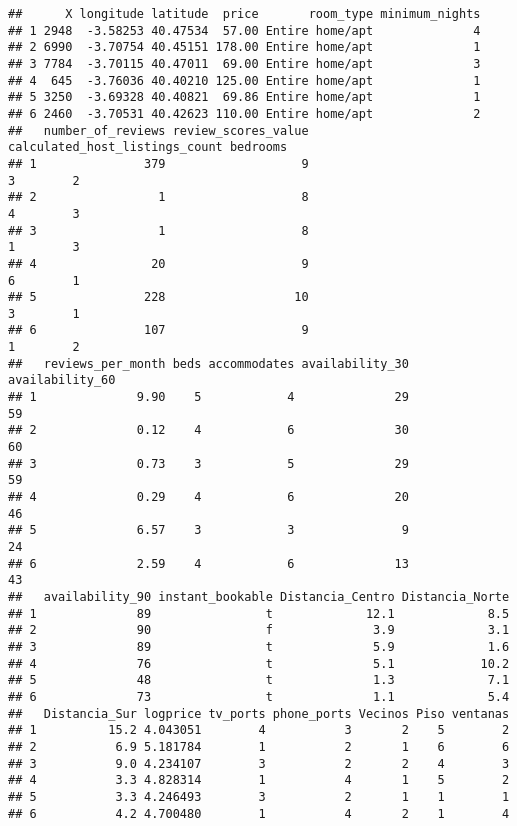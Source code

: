 \documentclass[
]{article}
\begin{document}
\begin{verbatim}
##      X longitude latitude  price       room_type minimum_nights
## 1 2948  -3.58253 40.47534  57.00 Entire home/apt              4
## 2 6990  -3.70754 40.45151 178.00 Entire home/apt              1
## 3 7784  -3.70115 40.47011  69.00 Entire home/apt              3
## 4  645  -3.76036 40.40210 125.00 Entire home/apt              1
## 5 3250  -3.69328 40.40821  69.86 Entire home/apt              1
## 6 2460  -3.70531 40.42623 110.00 Entire home/apt              2
##   number_of_reviews review_scores_value calculated_host_listings_count bedrooms
## 1               379                   9                              3        2
## 2                 1                   8                              4        3
## 3                 1                   8                              1        3
## 4                20                   9                              6        1
## 5               228                  10                              3        1
## 6               107                   9                              1        2
##   reviews_per_month beds accommodates availability_30 availability_60
## 1              9.90    5            4              29              59
## 2              0.12    4            6              30              60
## 3              0.73    3            5              29              59
## 4              0.29    4            6              20              46
## 5              6.57    3            3               9              24
## 6              2.59    4            6              13              43
##   availability_90 instant_bookable Distancia_Centro Distancia_Norte
## 1              89                t             12.1             8.5
## 2              90                f              3.9             3.1
## 3              89                t              5.9             1.6
## 4              76                t              5.1            10.2
## 5              48                t              1.3             7.1
## 6              73                t              1.1             5.4
##   Distancia_Sur logprice tv_ports phone_ports Vecinos Piso ventanas
## 1          15.2 4.043051        4           3       2    5        2
## 2           6.9 5.181784        1           2       1    6        6
## 3           9.0 4.234107        3           2       2    4        3
## 4           3.3 4.828314        1           4       1    5        2
## 5           3.3 4.246493        3           2       1    1        1
## 6           4.2 4.700480        1           4       2    1        4
\end{verbatim}
\end{document}
